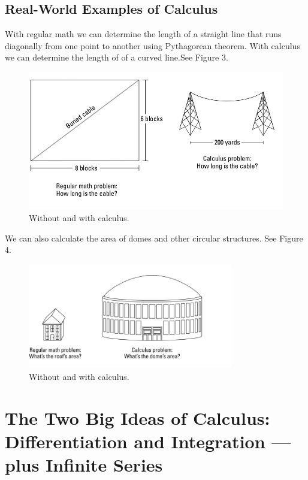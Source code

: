 \documentclass{article}
\begin{document}
\newpage
\subsection*{\LARGE Real-World Examples of Calculus}
With regular math we can determine the length of a straight line that runs diagonally from one point to another using Pythagorean theorem.
With calculus we can determine the length of of a curved line.See Figure 3.
\begin{figure}[h]
    \centering
    \includegraphics[width=1\textwidth]{figure-1-3.png}
    \caption{Without and with calculus.}
    \label{fig:03}
\end{figure}

We can also calculate the area of domes and other circular structures. See Figure 4.
\begin{figure}[h]
    \centering
    \includegraphics[width=0.8\textwidth]{figure-1-4.png}
    \caption{Without and with calculus.}
    \label{fig:03}
\end{figure}

\newpage


\section{\LARGE The Two Big Ideas of Calculus: \\Differentiation and Integration — \\plus Infinite Series}
\vspace*{5mm}
\end{document}
